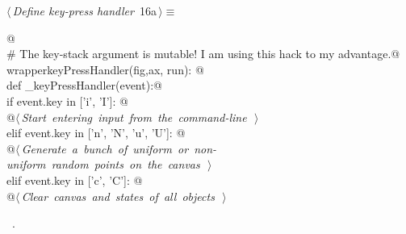 \documentclass[12pt]{report}
\begin{document}
\begin{flushleft} \small
\begin{minipage}{\linewidth}\label{scrap4}\raggedright\small
{} $\langle\,${\itshape Define key-press handler}\nobreak\ {\footnotesize {16a}}$\,\rangle\equiv$
\vspace{-1ex}
\begin{list}{}{} \item
\mbox{}\verb@   @\\
\mbox{}\verb@# The key-stack argument is mutable! I am using this hack to my advantage.@\\
\mbox{}\verb@def wrapperkeyPressHandler(fig,ax, run): @\\
\mbox{}\verb@       def _keyPressHandler(event):@\\
\mbox{}\verb@           if event.key in ['i', 'I']:  @\\
\mbox{}\verb@                @\hbox{$\langle\,${\itshape Start entering input from the command-line}\nobreak\ {\footnotesize {}}$\,\rangle$}\verb@@\\
\mbox{}\verb@           elif event.key in ['n', 'N', 'u', 'U']: @\\
\mbox{}\verb@                @\hbox{$\langle\,${\itshape Generate a bunch of uniform or non-uniform random points on the canvas}\nobreak\ {\footnotesize {}}$\,\rangle$}\verb@@\\
\mbox{}\verb@           elif event.key in ['c', 'C']: @\\
\mbox{}\verb@                @\hbox{$\langle\,${\itshape Clear canvas and states of all objects}\nobreak\ {\footnotesize {}}$\,\rangle$}\verb@@\\
\mbox{}\verb@@{\NWsep}
\end{list}
\vspace{-1.5ex}
\footnotesize
\begin{list}{}{\setlength{\itemsep}{-\parsep}\setlength{\itemindent}{-\leftmargin}}
\item \NWtxtMacroRefIn\ .

\item{}
\end{list}
\end{minipage}\vspace{4ex}
\end{flushleft}
\newchunk 
\end{document}
